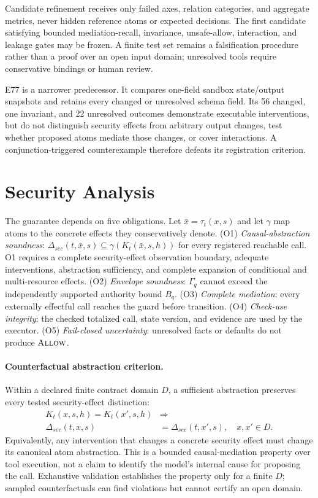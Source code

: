 \documentclass[letterpaper,twocolumn,10pt]{article}
\newcommand{\Allow}{\textsc{Allow}}
\begin{document}
Candidate refinement receives only failed axes, relation categories, and aggregate metrics, never hidden reference atoms or expected decisions. The first candidate satisfying bounded mediation-recall, invariance, unsafe-allow, interaction, and leakage gates may be frozen. A finite test set remains a falsification procedure rather than a proof over an open input domain; unresolved tools require conservative bindings or human review.

E77 is a narrower predecessor. It compares one-field sandbox state/output snapshots and retains every changed or unresolved schema field. Its 56 changed, one invariant, and 22 unresolved outcomes demonstrate executable interventions, but do not distinguish security effects from arbitrary output changes, test whether proposed atoms mediate those changes, or cover interactions. A conjunction-triggered counterexample therefore defeats its registration criterion.
 \section{Security Analysis}

The guarantee depends on five obligations. Let $\bar{x}=\tau_t(x,s)$ and let $\gamma$ map atoms to the concrete effects they conservatively denote. (O1) \emph{Causal-abstraction soundness}: $\Delta_{sec}(t,\bar{x},s)\subseteq\gamma(K_t(\bar{x},s,h))$ for every registered reachable call. O1 requires a complete security-effect observation boundary, adequate interventions, abstraction sufficiency, and complete expansion of conditional and multi-resource effects. (O2) \emph{Envelope soundness}: $\Gamma_q$ cannot exceed the independently supported authority bound $B_q$. (O3) \emph{Complete mediation}: every externally effectful call reaches the guard before transition. (O4) \emph{Check-use integrity}: the checked totalized call, state version, and evidence are used by the executor. (O5) \emph{Fail-closed uncertainty}: unresolved facts or defaults do not produce $\Allow$.

\paragraph{Counterfactual abstraction criterion.}
Within a declared finite contract domain $D$, a sufficient abstraction preserves every tested security-effect distinction:
\[
\begin{aligned}
  K_t(x,s,h)=K_t(x',s,h)&\Longrightarrow{}\\
  \Delta_{sec}(t,x,s)&=\Delta_{sec}(t,x',s),\quad x,x'\in D.
\end{aligned}
\]
Equivalently, any intervention that changes a concrete security effect must change its canonical atom abstraction. This is a bounded causal-mediation property over tool execution, not a claim to identify the model's internal cause for proposing the call. Exhaustive validation establishes the property only for a finite $D$; sampled counterfactuals can find violations but cannot certify an open domain.
\end{document}
